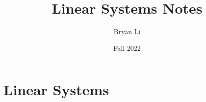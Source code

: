 \documentclass{../mimosis}
\title{Linear Systems Notes}
\author{Bryan Li}
\date{Fall 2022}
\begin{document}
    \frontmatter
    \maketitle
    \mainmatter
    \part{Linear Systems}
    
\end{document}
